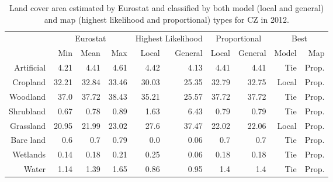 \begin{table}[H]
\centering
\caption{Land cover area estimated by Eurostat and classified by both model (local and general) and map (highest likelihood and proportional) types for CZ in 2012.}

\begin{tabular}{r|rrr|rr|rr|rr}
\toprule
{} & \multicolumn{3}{|c}{Eurostat} & \multicolumn{2}{|c}{Highest Likelihood} & \multicolumn{2}{|c}{Proportional} & \multicolumn{2}{|c}{Best} \\
{} &      Min &   Mean &    Max &              Local & General &        Local & General &  Model &    Map \\
\midrule
Artificial &     4.21 &   4.41 &   4.61 &               4.42 &    4.13 &         4.41 &    4.41 &    Tie &  Prop. \\
Cropland   &    32.21 &  32.84 &  33.46 &              30.03 &   25.35 &        32.79 &   32.75 &  Local &  Prop. \\
Woodland   &     37.0 &  37.72 &  38.43 &              35.21 &   25.57 &        37.72 &   37.72 &    Tie &  Prop. \\
Shrubland  &     0.67 &   0.78 &   0.89 &               1.63 &    6.43 &         0.79 &    0.79 &    Tie &  Prop. \\
Grassland  &    20.95 &  21.99 &  23.02 &               27.6 &   37.47 &        22.02 &   22.06 &  Local &  Prop. \\
Bare land  &      0.6 &    0.7 &   0.79 &                0.0 &    0.06 &          0.7 &     0.7 &    Tie &  Prop. \\
Wetlands   &     0.14 &   0.18 &   0.21 &               0.25 &    0.06 &         0.18 &    0.18 &    Tie &  Prop. \\
Water      &     1.14 &   1.39 &   1.65 &               0.86 &    0.95 &          1.4 &     1.4 &    Tie &  Prop. \\
\bottomrule
\end{tabular}
\end{table}

